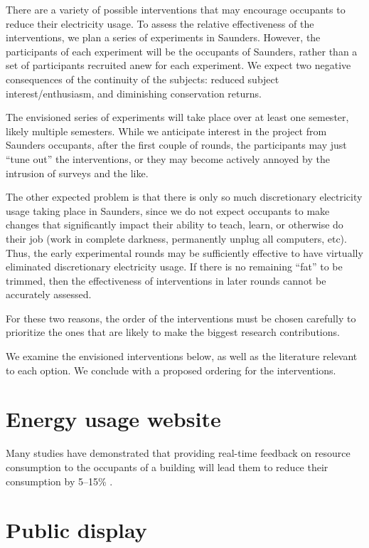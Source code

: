 \documentclass[11pt]{article}
\begin{document}
There are a variety of possible interventions that may encourage occupants to reduce their electricity usage. To assess the relative effectiveness of the interventions, we plan a series of experiments in Saunders. However, the participants of each experiment will be the occupants of Saunders, rather than a set of participants recruited anew for each experiment. We expect two negative consequences of the continuity of the subjects: reduced subject interest/enthusiasm, and diminishing conservation returns.

The envisioned series of experiments will take place over at least one semester, likely multiple semesters. While we anticipate interest in the project from Saunders occupants, after the first couple of rounds, the participants may just ``tune out'' the interventions, or they may become actively annoyed by the intrusion of surveys and the like.

The other expected problem is that there is only so much discretionary electricity usage taking place in Saunders, since we do not expect occupants to make changes that significantly impact their ability to teach, learn, or otherwise do their job (work in complete darkness, permanently unplug all computers, etc). Thus, the early experimental rounds may be sufficiently effective to have virtually eliminated discretionary electricity usage. If there is no remaining ``fat'' to be trimmed, then the effectiveness of interventions in later rounds cannot be accurately assessed.

For these two reasons, the order of the interventions must be chosen carefully to prioritize the ones that are likely to make the biggest research contributions.

We examine the envisioned interventions below, as well as the literature relevant to each option. We conclude with a proposed ordering for the interventions.

\section{Energy usage website}

Many studies have demonstrated that providing real-time feedback on resource consumption to the occupants of a building will lead them to reduce their consumption by 5--15\% \cite{darby-review-2006}.



\section{Public display}
\end{document}
